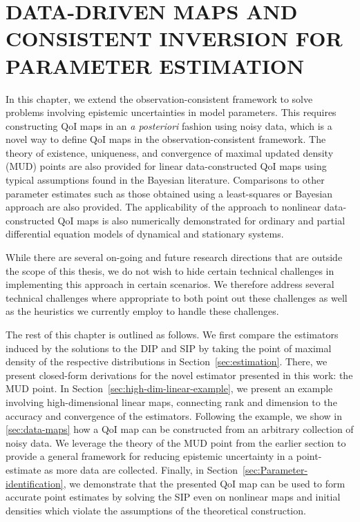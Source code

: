 \chapter{\uppercase{Data-Driven Maps and Consistent Inversion For Parameter Estimation} \label{chapter:mud}}

In this chapter, we extend the observation-consistent framework to solve problems involving epistemic uncertainties in model parameters.
This requires constructing QoI maps in an {\em a posteriori} fashion using noisy data, which is a novel way to define QoI maps in the observation-consistent framework.
The theory of existence, uniqueness, and convergence of maximal updated density (MUD) points are also provided for linear data-constructed QoI maps using typical assumptions found in the Bayesian literature.
Comparisons to other parameter estimates such as those obtained using a least-squares or Bayesian approach are also provided.
The applicability of the approach to nonlinear data-constructed QoI maps is also numerically demonstrated for ordinary and partial differential equation models of dynamical and stationary systems.

While there are several on-going and future research directions that are outside the scope of this thesis, we do not wish to hide certain technical challenges in implementing this approach in certain scenarios.
We therefore address several technical challenges where appropriate to both point out these challenges as well as the heuristics we currently employ to handle these challenges.


The rest of this chapter is outlined as follows.
We first compare the estimators induced by the solutions to the DIP and SIP by taking the point of maximal density of the respective distributions in Section~\ref{sec:estimation}.
There, we present closed-form derivations for the novel estimator presented in this work: the MUD point.
In Section~\ref{sec:high-dim-linear-example}, we present an example involving high-dimensional linear maps, connecting rank and dimension to the accuracy and convergence of the estimators.
Following the example, we show in \ref{sec:data-maps} how a QoI map can be constructed from an arbitrary collection of noisy data.
We leverage the theory of the MUD point from the earlier section to provide a general framework for reducing epistemic uncertainty in a point-estimate as more data are collected.
Finally, in Section~\ref{sec:Parameter-identification}, we demonstrate that the presented QoI map can be used to form accurate point estimates by solving the SIP even on nonlinear maps and initial densities which violate the assumptions of the theoretical construction.

